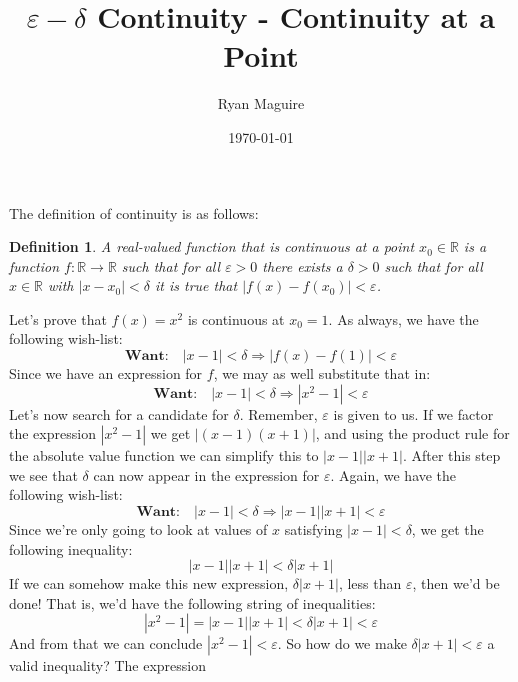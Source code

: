 \documentclass{article}
\title{$\varepsilon-\delta$ Continuity - Continuity at a Point}
\author{Ryan Maguire}
\date{\today}
\theoremstyle{normal}
\newtheorem{definition}{Definition}
\begin{document}
    \maketitle
    The definition of continuity is as follows:
    \begin{definition}
        A real-valued function that is continuous at a point
        $x_{0}\in\mathbb{R}$ is a function $f:\mathbb{R}\rightarrow\mathbb{R}$
        such that for all $\varepsilon>0$ there exists a $\delta>0$ such that
        for all $x\in\mathbb{R}$ with $|x-x_{0}|<\delta$ it is true that
        $|f(x)-f(x_{0})|<\varepsilon$.
    \end{definition}
    Let's prove that $f(x)=x^{2}$ is continuous at $x_{0}=1$. As always, we
    have the following wish-list:
    \begin{equation}
        \textbf{Want:}\quad|x-1|<\delta
        \Rightarrow|f(x)-f(1)|<\varepsilon
    \end{equation}
    Since we have an expression for $f$, we may as well substitute that in:
    \begin{equation}
        \textbf{Want:}\quad|x-1|<\delta
        \Rightarrow|x^{2}-1|<\varepsilon
    \end{equation}
    Let's now search for a candidate for $\delta$. Remember, $\varepsilon$ is
    given to us. If we factor the expression $|x^{2}-1|$ we get
    $|(x-1)(x+1)|$, and using the product rule for the absolute value function
    we can simplify this to $|x-1||x+1|$. After this step we see that $\delta$
    can now appear in the expression for $\varepsilon$. Again, we have the
    following wish-list:
    \begin{equation}
        \textbf{Want:}\quad|x-1|<\delta
        \Rightarrow|x-1||x+1|<\varepsilon
    \end{equation}
    Since we're only going to look at values of $x$ satisfying
    $|x-1|<\delta$, we get the following inequality:
    \begin{equation}
        |x-1||x+1|<\delta|x+1|
    \end{equation}
    If we can somehow make this new expression, $\delta|x+1|$, less than
    $\varepsilon$, then we'd be done! That is, we'd
    have the following string of inequalities:
    \begin{equation}
        |x^{2}-1|=|x-1||x+1|<\delta|x+1|<\varepsilon
    \end{equation}
    And from that we can conclude $|x^{2}-1|<\varepsilon$. So how do we make
    $\delta|x+1|<\varepsilon$ a valid inequality? The expression
\end{document}

